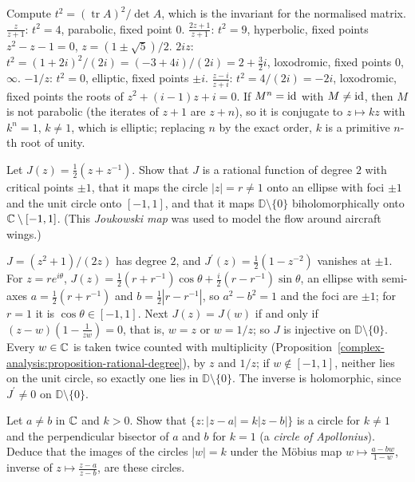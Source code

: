 \begin{solution}
Compute $t^2 = (\operatorname{tr}A)^2/\det A$, which is the invariant for the normalised matrix. $\frac{z}{z + 1}$: $t^2 = 4$, parabolic, fixed point $0$. $\frac{2z + 1}{z + 1}$: $t^2 = 9$, hyperbolic, fixed points
$z^2 - z - 1 = 0$, $z = (1 \pm \sqrt5)/2$. $2iz$: $t^2 = (1 + 2i)^2/(2i) = (-3 + 4i)/(2i) = 2 + \frac32i$, loxodromic, fixed points $0$, $\infty$. $-1/z$: $t^2 = 0$, elliptic, fixed points $\pm i$. $\frac{z - i}{z + i}$:
$t^2 = 4/(2i) = -2i$, loxodromic, fixed points the roots of $z^2 + (i - 1)z + i = 0$. If $M^n = \mathrm{id}$ with $M \neq \mathrm{id}$, then $M$ is not parabolic (the iterates of $z + 1$ are $z + n$), so it is conjugate to $z \mapsto kz$
with $k^n = 1$, $k \neq 1$, which is elliptic; replacing $n$ by the exact order, $k$ is a primitive $n$-th root of unity.
\end{solution}

\begin{exercise}\label{complex-analysis:exercise-joukowski}
Let $J(z) = \frac12(z + z^{-1})$. Show that $J$ is a rational function of degree $2$ with critical points $\pm1$, that it maps the circle $|z| = r \neq 1$ onto an ellipse with foci $\pm1$ and the unit circle onto
$[-1, 1]$, and that it maps $\mathbb{D} \setminus \{0\}$ biholomorphically onto $\mathbb{C} \setminus [-1, 1]$. (This \emph{Joukowski map} was used to model the flow around aircraft wings.)
\end{exercise}

\begin{solution}
$J = (z^2 + 1)/(2z)$ has degree $2$, and $J^{\prime}(z) = \frac12(1 - z^{-2})$ vanishes at $\pm1$. For $z = re^{i\theta}$, $J(z) = \frac12(r + r^{-1})\cos\theta + \frac i2(r - r^{-1})\sin\theta$, an ellipse with semi-axes
$a = \frac12(r + r^{-1})$ and $b = \frac12|r - r^{-1}|$, so $a^2 - b^2 = 1$ and the foci are $\pm1$; for $r = 1$ it is $\cos\theta \in [-1, 1]$. Next $J(z) = J(w)$ if and only if $(z - w)(1 - \frac{1}{zw}) = 0$, that is,
$w = z$ or $w = 1/z$; so $J$ is injective on $\mathbb{D} \setminus \{0\}$. Every $w \in \mathbb{C}$ is taken twice counted with multiplicity (Proposition~\ref{complex-analysis:proposition-rational-degree}), by $z$ and $1/z$;
if $w \notin [-1, 1]$, neither lies on the unit circle, so exactly one lies in $\mathbb{D} \setminus \{0\}$. The inverse is holomorphic, since $J^{\prime} \neq 0$ on $\mathbb{D} \setminus \{0\}$.
\end{solution}

\begin{exercise}\label{complex-analysis:exercise-apollonius}
Let $a \neq b$ in $\mathbb{C}$ and $k > 0$. Show that $\{z : |z - a| = k|z - b|\}$ is a circle for $k \neq 1$ and the perpendicular bisector of $a$ and $b$ for $k = 1$ (a \emph{circle of Apollonius}). Deduce that the
images of the circles $|w| = k$ under the M\"obius map $w \mapsto \frac{a - bw}{1 - w}$, inverse of $z \mapsto \frac{z - a}{z - b}$, are these circles.
\end{exercise}

